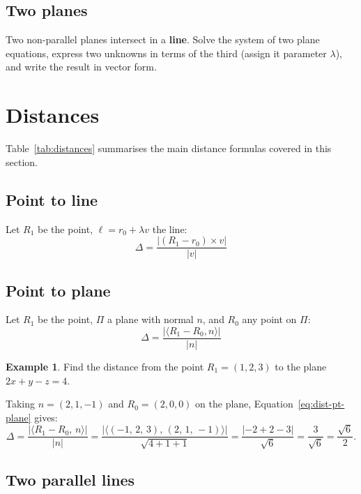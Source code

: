\documentclass[11pt]{article}
\theoremstyle{plain}
\theoremstyle{definition}
\newtheorem{example}{Example}[section]
\newcommand{\ip}[2]{\langle #1,\, #2 \rangle}
\begin{document}
\subsection{Two planes}

Two non-parallel planes intersect in a \textbf{line}. Solve the system of two plane equations, express two unknowns in terms of the third (assign it parameter $\lambda$), and write the result in vector form.

\newpage

\section{Distances}

Table~\ref{tab:distances} summarises the main distance formulas covered in this section.

\subsection{Point to line}

Let $R_1$ be the point, $\ell = r_0 + \lambda v$ the line:
\[
\Delta = \frac{|(R_1 - r_0) \times v|}{|v|}
\]

\subsection{Point to plane}

Let $R_1$ be the point, $\Pi$ a plane with normal $n$, and $R_0$ any point on $\Pi$:
\begin{equation}
\Delta = \frac{|\langle R_1 - R_0, n \rangle|}{|n|}
\label{eq:dist-pt-plane}
\end{equation}

\begin{example}
Find the distance from the point $R_1 = (1, 2, 3)$ to the plane $2x + y - z = 4$.

\noindent Taking $n = (2, 1, -1)$ and $R_0 = (2, 0, 0)$ on the plane, Equation~\eqref{eq:dist-pt-plane} gives:
\[
\Delta = \frac{|\ip{R_1 - R_0}{n}|}{|n|}
       = \frac{|\ip{(-1,\, 2,\, 3)}{(2,\, 1,\, -1)}|}{\sqrt{4+1+1}}
       = \frac{|-2 + 2 - 3|}{\sqrt{6}}
       = \frac{3}{\sqrt{6}}
       = \frac{\sqrt{6}}{2}.
\]
\end{example}

\subsection{Two parallel lines}
\end{document}
